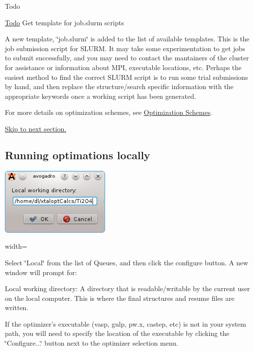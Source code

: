 \begin{DoxyRefDesc}{Todo}
\item[\hyperlink{todo__todo000003}{Todo}]Get template for job.\-slurm scripts\end{DoxyRefDesc}


A new template, \char`\"{}job.\-slurm\char`\"{} is added to the list of available templates. This is the job submission script for S\-L\-U\-R\-M. It may take some experimentation to get jobs to submit successfully, and you may need to contact the mantainers of the cluster for assistance or information about M\-P\-I, executable locations, etc. Perhaps the easiest method to find the correct S\-L\-U\-R\-M script is to run some trial submissions by hand, and then replace the structure/search specific information with the appropriate keywords once a working script has been generated.

For more details on optimization schemes, see \hyperlink{optschemes}{Optimization Schemes}.

\hyperlink{tut-xo_files}{Skip to next section.}\hypertarget{tut-xo_localqi}{}\subsection{Running optimations locally}\label{tut-xo_localqi}
 
\begin{DoxyImage}
\includegraphics{opt-set-local.png}
\caption{width=}
\end{DoxyImage}


Select \char`\"{}\-Local\char`\"{} from the list of Queues, and then click the configure button. A new window will prompt for\-:
\begin{DoxyItemize}
\item Local working directory\-: A directory that is readable/writable by the current user on the local computer. This is where the final structures and resume files are written.
\end{DoxyItemize}

If the optimizer's executable (vasp, gulp, pw.\-x, castep, etc) is not in your system path, you will need to specify the location of the executable by clicking the \char`\"{}\-Configure...\char`\"{} button next to the optimizer selection menu.

